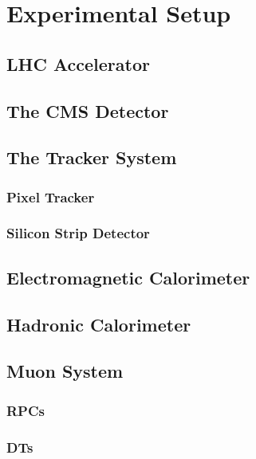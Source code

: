 \chapter[Experimental Setup]{Experimental Setup}
\label{chap:CMSExp}

\section{LHC Accelerator}
\label{sec:LHC}

\section{The CMS Detector}
\label{sec:CMS}

\section{The Tracker System}
\label{sec:Tracker}

\subsection{Pixel Tracker}
\label{subsec:Pixel}

\subsection{Silicon Strip Detector}
\label{subsec:Strip}

\section{Electromagnetic Calorimeter}
\label{sec:ECal}

\section{Hadronic Calorimeter}
\label{sec:HCal}

\section{Muon System}
\label{sec:MuonSys}

\subsection{RPCs}
\label{subsec:RPCs}

\subsection{DTs}
\label{subsec:DTs}

